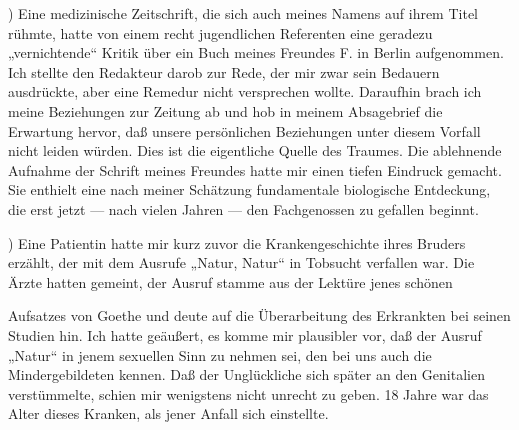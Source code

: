 \documentclass{article}
\begin{document}
            
        ) Eine medizinische Zeitschrift, die sich auch meines
               Namens auf ihrem Titel rühmte, hatte von einem recht jugendlichen Referenten eine
               geradezu „vernichtende“ Kritik über ein Buch
               meines Freundes F. in Berlin aufgenommen. Ich stellte den Redakteur
               darob zur Rede, der mir zwar sein Bedauern ausdrückte, aber eine Remedur
               nicht versprechen wollte. Daraufhin brach ich meine Beziehungen zur
               Zeitung ab und hob in meinem Absagebrief die Erwartung hervor, daß unsere persönlichen Beziehungen unter diesem Vorfall nicht leiden würden.
               Dies ist die eigentliche Quelle des Traumes. Die ablehnende Aufnahme der Schrift
               meines Freundes hatte mir einen tiefen Eindruck gemacht. Sie enthielt eine
               nach meiner Schätzung fundamentale biologische Entdeckung, die erst
               jetzt — nach vielen Jahren — den Fachgenossen zu gefallen beginnt.
        \pend
    
            
        ) Eine Patientin hatte mir kurz zuvor die
               Krankengeschichte ihres Bruders erzählt, der mit dem Ausrufe „Natur,
               Natur“ in Tobsucht verfallen war. Die Ärzte
               hatten gemeint, der Ausruf stamme aus der Lektüre jenes schönen
        \pend
    
         
            
            
            
        \pstart
        Aufsatzes von Goethe und deute auf die
               Überarbeitung des Erkrankten bei seinen Studien hin. Ich hatte geäußert,
               es komme mir plausibler vor, daß der Ausruf
               „Natur“ in jenem sexuellen Sinn zu nehmen sei, den bei uns auch die
               Mindergebildeten kennen. Daß der Unglückliche sich später an den
               Genitalien verstümmelte, schien mir wenigstens nicht unrecht zu geben. 18 Jahre war das Alter dieses Kranken, als jener
               Anfall sich einstellte.
        \pend
    
\end{document}
